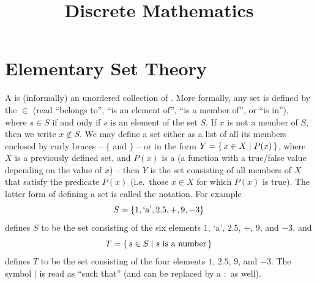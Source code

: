 
\title{\textbf{Discrete Mathematics}}

\date{}
\maketitle

\begingroup
\let\clearpage\relax
\tableofcontents
\endgroup

\clearpage

\renewcommand{\nomname}{List of Symbols}
\printnomenclature[10em]

\clearpage

\section{Elementary Set Theory}\label{sec:SetTheory}

A  is (informally) an unordered collection of . More formally, any set is defined by the  $\in$ (read ``belongs to'', ``is an element of'', ``is a member of'', or ``is in''), where $s \in S$ if and only if $s$ is an element of the set $S$. If $x$ is not a member of $S$, then we write $x \notin S$. We may define a set either as a list of all its members enclosed by curly braces -- $\{$ and $\}$ -- or in the form $Y = \qty{\, x \in X \mid P(x) \,}$, where $X$ is a previously defined set, and $P(x)$ is a  (a function with a true/false value depending on the value of $x$) -- then $Y$ is the set consisting of all members of $X$ that satisfy the predicate $P(x)$ (i.e.\ those $x \in X$ for which $P(x)$ is true). The latter form of defining a set is called the  notation. For example
\begin{equation*}
S = \qty{1, \text{`a'}, 2.5, +, 9, -3}
\end{equation*}
defines $S$ to be the set consisting of the six elements $1$, `a', $2.5$, $+$, $9$, and $-3$, and
\begin{equation*}
T = \qty{\, s \in S \mid s\ \text{is a number} \,}
\end{equation*}
defines $T$ to be the set consisting of the four elements $1$, $2.5$, $9$, and $-3$. The symbol {$|$} is read as ``such that'' (and can be replaced by a $:$ as well).

